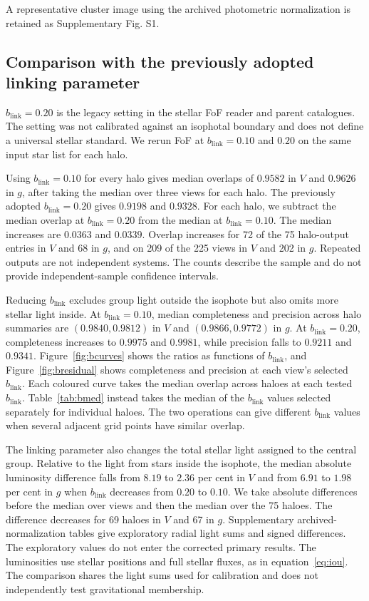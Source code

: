 \documentclass[usenatbib]{mnras}
\begin{document}
A representative cluster image using the archived photometric normalization is retained as Supplementary Fig. S1.

\subsection{Comparison with the previously adopted linking parameter}
\label{sec:comparison}

$b_{\mathrm{link}}=0.20$ is the legacy setting in the stellar FoF reader
and parent catalogues. The setting was not calibrated against an isophotal
boundary and does not define a universal stellar standard. We rerun FoF at
$b_{\mathrm{link}}=0.10$ and $0.20$ on the same input star list for each
halo.

Using $b_{\mathrm{link}}=0.10$ for every halo gives median overlaps of $0.9582$ in $V$
and $0.9626$ in $g$, after taking the median over three views for each
halo. The previously adopted $b_{\mathrm{link}}=0.20$ gives $0.9198$ and $0.9328$.
For each halo, we subtract the median overlap at $b_{\mathrm{link}}=0.20$ from the
median at $b_{\mathrm{link}}=0.10$. The median increases are $0.0363$ and $0.0339$.
Overlap increases for 72 of the 75 halo-output entries in $V$ and 68 in
$g$, and on 209 of the 225 views in $V$ and 202 in $g$. Repeated outputs
are not independent systems. The counts describe the sample and do not
provide independent-sample confidence intervals.

Reducing $b_{\mathrm{link}}$ excludes group light outside the isophote but also omits
more stellar light inside. At $b_{\mathrm{link}}=0.10$, median completeness and precision
across halo summaries are $(0.9840,0.9812)$ in $V$ and $(0.9866,0.9772)$
in $g$. At $b_{\mathrm{link}}=0.20$, completeness increases to $0.9975$ and $0.9981$,
while precision falls to $0.9211$ and $0.9341$.
Figure~\ref{fig:bcurves} shows the ratios as functions of $b_{\mathrm{link}}$, and
Figure~\ref{fig:bresidual} shows completeness and precision at each
view's selected $b_{\mathrm{link}}$.
Each coloured curve takes the median overlap across haloes at each
tested $b_{\mathrm{link}}$. Table~\ref{tab:bmed} instead takes the median of the $b_{\mathrm{link}}$
values selected separately for individual haloes. The two operations
can give different $b_{\mathrm{link}}$ values when several adjacent grid points have
similar overlap.

The linking parameter also changes the total stellar light assigned
to the central group. Relative to the light from stars inside the
isophote, the median absolute luminosity difference falls from
$8.19$ to $2.36$ per cent in $V$ and from $6.91$ to $1.98$ per cent in
$g$ when $b_{\mathrm{link}}$ decreases from $0.20$ to $0.10$.
We take absolute differences before the median over views and then
the median over the 75 haloes. The difference decreases for 69 haloes
in $V$ and 67 in $g$. Supplementary archived-normalization tables give exploratory radial light sums
and signed differences. The exploratory values do not enter the corrected primary results. The luminosities use stellar positions and
full stellar fluxes, as in equation~\ref{eq:iou}. The comparison shares
the light sums used for calibration and does not independently test
gravitational membership.
\end{document}
